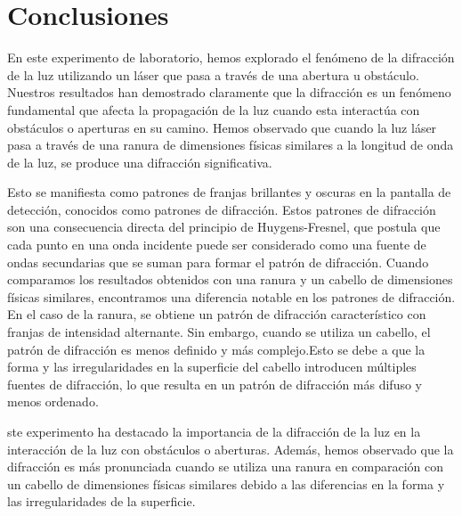 \documentclass[twocolumn, 12pt]{article}
\begin{document}
\section{Conclusiones}

En este experimento de laboratorio, hemos explorado el
fenómeno de la difracción de la luz utilizando un láser que
pasa a través de una abertura u obstáculo. Nuestros
resultados han demostrado claramente que la difracción es
un fenómeno fundamental que afecta la propagación de la luz
cuando esta interactúa con obstáculos o aperturas en su
camino. Hemos observado que cuando la luz láser pasa a
través de una ranura de dimensiones físicas similares a la
longitud de onda de la luz, se produce una difracción
significativa.

Esto se manifiesta como patrones de franjas brillantes y
oscuras en la pantalla de detección, conocidos como
patrones de difracción. Estos patrones de difracción son
una consecuencia directa del principio de Huygens-Fresnel,
que postula que cada punto en una onda incidente puede ser
considerado como una fuente de ondas secundarias que se
suman para formar el patrón de difracción. Cuando
comparamos los resultados obtenidos con una ranura y un
cabello de dimensiones físicas similares, encontramos una
diferencia notable en los patrones de difracción. En el
caso de la ranura, se obtiene un patrón de difracción
característico con franjas de intensidad alternante. Sin
embargo, cuando se utiliza un cabello, el patrón de
difracción es menos definido y más complejo.Esto se debe a
que la forma y las irregularidades en la superficie del
cabello introducen múltiples fuentes de difracción, lo que
resulta en un patrón de difracción más difuso y menos
ordenado.

ste experimento ha destacado la importancia de la
difracción de la luz en la interacción de la luz con
obstáculos o aberturas. Además, hemos observado que la
difracción es más pronunciada cuando se utiliza una ranura
en comparación con un cabello de dimensiones físicas
similares debido a las diferencias en la forma y las
irregularidades de la superficie.

\printbibliography
\end{document}
